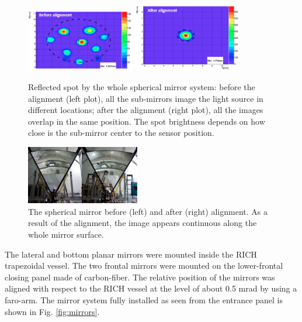 \documentclass[5p,times,twocolumn]{elsarticle}
\begin{document}
\begin{figure}
\begin{center}
\includegraphics[width=0.42\textwidth]{mirror_spot1.png}
\includegraphics[width=0.42\textwidth]{mirror_spot2.png}
\caption{Reflected spot by the whole spherical mirror system: before the alignment (left plot), all the sub-mirrors image the light source in different locations; after the alignment (right plot), all the images overlap in the same position. The spot brightness depends on how close is the sub-mirror center to the sensor position.}
\label{fig:MirSpots}
\end{center}
\end{figure}

\begin{figure}
\begin{center}
\includegraphics[width=0.44\textwidth]{mirror_sphere.png}
\caption{The spherical mirror before (left) and after (right) alignment. As a result of the alignment, the image appears continuous along the whole mirror surface.}
\label{fig:MirAlign}
\end{center}
\end{figure}

The lateral and bottom planar mirrors were mounted inside the RICH trapezoidal vessel. The two frontal mirrors were mounted on the lower-frontal closing panel made of carbon-fiber. The relative position of the mirrors was aligned with respect to the RICH vessel at the level of about 0.5 mrad by using a faro-arm. The mirror system fully installed as seen from the entrance panel is shown in Fig. \ref{fig:mirrors}.
\end{document}
